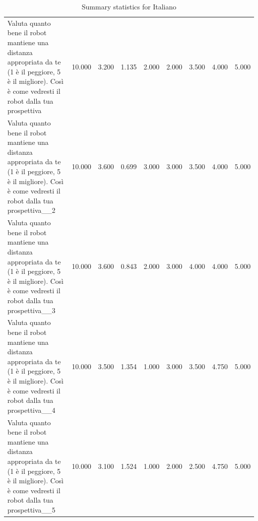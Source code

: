 \begin{table}[ht]
\begin{tabular}{lrrrrrrrr}
Valuta quanto bene il robot mantiene una distanza appropriata da te  (1 è il peggiore, 5 è il migliore). Così è come vedresti il robot dalla tua prospettiva & 10.000 & 3.200 & 1.135 & 2.000 & 2.000 & 3.500 & 4.000 & 5.000 \\
Valuta quanto bene il robot mantiene una distanza appropriata da te  (1 è il peggiore, 5 è il migliore). Così è come vedresti il robot dalla tua prospettiva__2 & 10.000 & 3.600 & 0.699 & 3.000 & 3.000 & 3.500 & 4.000 & 5.000 \\
Valuta quanto bene il robot mantiene una distanza appropriata da te  (1 è il peggiore, 5 è il migliore). Così è come vedresti il robot dalla tua prospettiva__3 & 10.000 & 3.600 & 0.843 & 2.000 & 3.000 & 4.000 & 4.000 & 5.000 \\
Valuta quanto bene il robot mantiene una distanza appropriata da te  (1 è il peggiore, 5 è il migliore). Così è come vedresti il robot dalla tua prospettiva__4 & 10.000 & 3.500 & 1.354 & 1.000 & 3.000 & 3.500 & 4.750 & 5.000 \\
Valuta quanto bene il robot mantiene una distanza appropriata da te  (1 è il peggiore, 5 è il migliore). Così è come vedresti il robot dalla tua prospettiva__5 & 10.000 & 3.100 & 1.524 & 1.000 & 2.000 & 2.500 & 4.750 & 5.000 \\
\bottomrule
\end{tabular}
\caption{Summary statistics for Italiano}\n\label{tab:stats_Italiano}\n\end{table}
